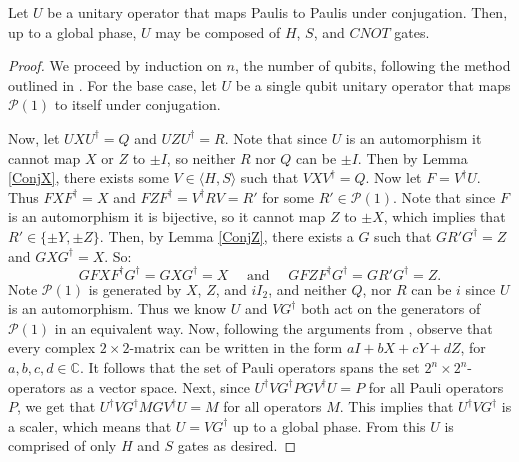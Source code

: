 \documentclass[12pt]{dalthesis}
\begin{document}
\begin{theorem}
\label{HSCNOT}
Let $U$ be a unitary operator that maps Paulis to Paulis under conjugation. Then, up to a global phase, $U$ may be composed of $H$, $S$, and $CNOT$ gates.
\end{theorem}
\begin{proof}
We proceed by induction on $n$, the number of qubits, following the method outlined in \cite{nielsen00}.
For the base case, let $U$ be a single qubit unitary operator that maps $\mathcal{P}(1)$ to itself under conjugation. 

Now, let $UXU^\dag = Q$ and $UZU^\dag = R$. Note that since $U$ is an automorphism it cannot map $X$ or $Z$ to $\pm I$, so neither $R$ nor $Q$ can be $\pm I$. Then by Lemma \ref{ConjX}, there exists some $V \in \langle H, S \rangle$ such that $VXV^\dag = Q$. Now let $F = V^\dag U$. Thus $FXF^\dag = X$ and $FZF^\dag = V^\dag R V = R'$ for some $R' \in \mathcal{P}(1)$. Note that since $F$ is an automorphism it is bijective, so it cannot map $Z$ to $\pm X$, which implies that $R' \in \{\pm Y, \pm Z \}$. Then, by Lemma \ref{ConjZ}, there exists a $G$ such that $GR'G^\dag = Z$ and $GXG^\dag = X$. So:
\[ 
G FXF^\dag G^\dag = G XG^\dag = X  \quad \mbox{ and } \quad
G FZF^\dag G^\dag = G R' G^\dag = Z.
\]
Note $\mathcal{P}(1)$ is generated by $X$, $Z$, and $iI_2$, and neither $Q$, nor $R$ can be $i$ since $U$ is an automorphism. Thus we know $U$ and $VG^\dagger$ both act on the generators of $\mathcal{P}(1)$ in an equivalent way. Now, following the arguments from \cite{Selinger_gen}, observe that every complex $2 \times 2$-matrix can be written in the form $aI + bX + cY + dZ$, for $a, b, c, d \in \mathbb{C}$. It follows that the set of Pauli operators spans the set $2^n \times 2^n$-operators as a vector space. Next, since $U^\dagger VG^\dagger P G V^\dagger U = P$ for all Pauli operators $P$, we get that $U^\dagger VG^\dagger M GV^\dagger U = M$ for all operators $M$. This implies that $U^\dagger VG^\dagger$ is a scaler, which means that $U = VG^\dagger$ up to a global phase. From this $U$ is comprised of only $H$ and $S$ gates as desired.


\end{proof}
\end{document}
